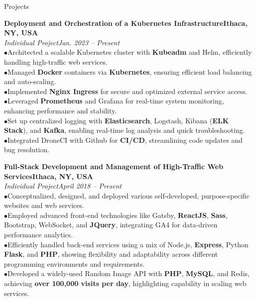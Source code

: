 \documentclass{resume} %
\begin{document}
\begin{rSection}{Projects}


{\bf Deployment and Orchestration of a Kubernetes Infrastructure}\hfill{\textbf{Ithaca, NY, USA}}
\\{\em Individual Project}\hfill {\em Jan. 2023 -- Present}
\\ $ \bullet $Architected a scalable Kubernetes cluster with \textbf{Kubeadm} and Helm, efficiently handling high-traffic web services.
\\ $ \bullet $Managed \textbf{Docker} containers via \textbf{Kubernetes}, ensuring efficient load balancing and auto-scaling.
\\ $ \bullet $Implemented \textbf{Nginx Ingress} for secure and optimized external service access.
\\ $ \bullet $Leveraged \textbf{Prometheus} and Grafana for real-time system monitoring, enhancing performance and stability.
\\ $ \bullet $Set up centralized logging with \textbf{Elasticsearch}, Logstash, Kibana (\textbf{ELK Stack}), and \textbf{Kafka}, enabling real-time log analysis and quick troubleshooting.
\\ $ \bullet $Integrated DroneCI with Github for \textbf{CI/CD}, streamlining code updates and bug resolution.



{\bf Full-Stack Development and Management of High-Traffic Web Services}\hfill{\textbf{Ithaca, NY, USA}}
\\{\em Individual Project}\hfill {\em April 2018 -- Present}
\\ $ \bullet $Conceptualized, designed, and deployed various self-developed, purpose-specific websites and web services.
\\ $ \bullet $Employed advanced front-end technologies like Gatsby, \textbf{ReactJS}, \textbf{Sass}, Bootstrap, WebSocket, and \textbf{JQuery}, integrating GA4 for data-driven performance analytics.
\\ $ \bullet $Efficiently handled back-end services using a mix of Node.js, \textbf{Express}, Python \textbf{Flask}, and \textbf{PHP}, showing flexibility and adaptability across different programming environments and requirements.
\\ $ \bullet $Developed a widely-used Random Image API with \textbf{PHP}, \textbf{MySQL}, and Redis, achieving \textbf{over 100,000 visits per day}, highlighting capability in scaling web services.


\end{rSection}
\end{document}
